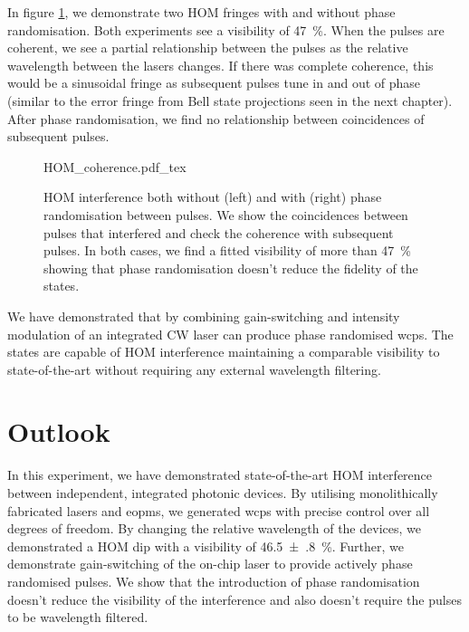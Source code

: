 In figure \ref{fig:HOM_coherence}, we demonstrate two \ac{HOM} fringes with and without phase randomisation. Both experiments see a visibility of \SI{47}{\percent}. When the pulses are coherent, we see a partial relationship between the pulses as the relative wavelength between the lasers changes. If there was complete coherence, this would be a sinusoidal fringe as subsequent pulses tune in and out of phase (similar to the error fringe from Bell state projections seen in the next chapter). After phase randomisation, we find no relationship between coincidences of subsequent pulses.

\begin{figure}[tp]
	\centering
	\tiny
	\def\svgwidth{\textwidth} 
	{HOM_coherence.pdf_tex}
	\caption[Hong-Ou-Mandel interference with and without phase randomisation]{\ac{HOM} interference both without (left) and with (right) phase randomisation between pulses. We show the coincidences between pulses that interfered and check the coherence with subsequent pulses. In both cases, we find a fitted visibility of more than \SI{47}{\%} showing that phase randomisation doesn't reduce the fidelity of the states.}
	\label{fig:HOM_coherence}
\end{figure}

We have demonstrated that by combining gain-switching and intensity modulation of an integrated \ac{CW} laser can produce phase randomised \acp{wcp}. The states are capable of \ac{HOM} interference maintaining a comparable visibility to state-of-the-art without requiring any external wavelength filtering.

\section{Outlook}

In this experiment, we have demonstrated state-of-the-art \acl{HOM} interference between independent, integrated photonic devices. By utilising monolithically fabricated lasers and \acp{eopm}, we generated \acp{wcp} with precise control over all degrees of freedom. By changing the relative wavelength of the devices, we demonstrated a \ac{HOM} dip with a visibility of \SI{46.5(8)}{\%}. Further, we demonstrate gain-switching of the on-chip laser to provide actively phase randomised pulses. We show that the introduction of phase randomisation doesn't reduce the visibility of the interference and also doesn't require the pulses to be wavelength filtered.

